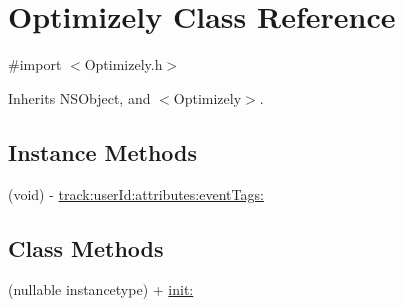 \hypertarget{interface_optimizely}{}\section{Optimizely Class Reference}
\label{interface_optimizely}


{\ttfamily \#import $<$Optimizely.\+h$>$}



Inherits N\+S\+Object, and $<$\+Optimizely$>$.

\subsection*{Instance Methods}
\begin{DoxyCompactItemize}
\item 
(void) -\/ \mbox{\hyperlink{interface_optimizely_ac8630f5b706a02b20e7ba66e15addc42}{track\+:user\+Id\+:attributes\+:event\+Tags\+:}}
\end{DoxyCompactItemize}
\subsection*{Class Methods}
\begin{DoxyCompactItemize}
\item 
(nullable instancetype) + \mbox{\hyperlink{interface_optimizely_a6fdb3abc6df8054f6780cf27c16b6e51}{init\+:}}
\end{DoxyCompactItemize}
